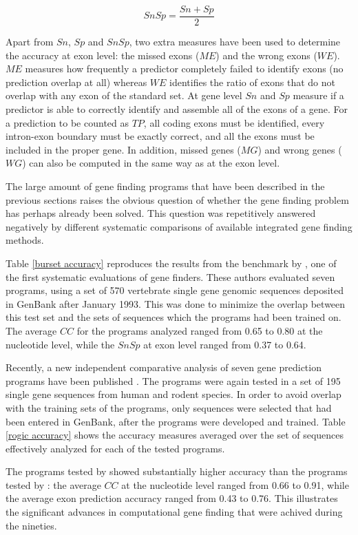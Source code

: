 \begin{equation}
SnSp = \frac{Sn + Sp}{2}
\end{equation}

Apart from $Sn$, $Sp$ and $SnSp$, two extra measures have been used to
determine the accuracy at exon level: the missed exons ($ME$) and the
wrong exons ($WE$). $ME$ measures how frequently a predictor
completely failed to identify exons (no prediction overlap at all)
whereas $WE$ identifies the ratio of exons that do not overlap with
any exon of the standard set. At gene level $Sn$ and $Sp$ measure if a
predictor is able to correctly identify and assemble all of the exons
of a gene. For a prediction to be counted as $TP$, all coding exons
must be identified, every intron-exon boundary must be exactly
correct, and all the exons must be included in the proper gene. In
addition, missed genes ($MG$) and wrong genes ($WG$) can also be
computed in the same way as at the exon level.

The large amount of gene finding programs that have been described in
the previous sections raises the obvious question of whether the gene
finding problem has perhaps already been solved. This question was
repetitively answered negatively by different systematic
comparisons of available integrated gene finding methods.

Table \ref{burset accuracy} reproduces the results from the benchmark
by \cite{burset:1996a}, one of the first systematic evaluations of
gene finders. These authors evaluated seven programs, using a set of
570 vertebrate single gene genomic sequences deposited in GenBank
after January 1993. This was done to minimize the overlap between this
test set and the sets of sequences which the programs had been trained
on. The average $CC$ for the programs analyzed ranged from 0.65 to
0.80 at the nucleotide level, while the $SnSp$ at exon level ranged
from 0.37 to 0.64.

Recently, a new independent comparative analysis of seven gene
prediction programs have been published \citep{rogic:2001a}. The
programs were again tested in a set of 195 single gene sequences from
human and rodent species. In order to avoid overlap with the training
sets of the programs, only sequences were selected that had been
entered in GenBank, after the programs were developed and
trained. Table
\ref{rogic accuracy} shows the accuracy measures averaged over the set
of sequences effectively analyzed for each of the tested programs.

The programs tested by \cite{rogic:2001a} showed substantially higher
accuracy than the programs tested by \cite{burset:1996a}: the average
$CC$ at the nucleotide level ranged from 0.66 to 0.91, while the
average exon prediction accuracy ranged from 0.43 to 0.76. This
illustrates the significant advances in computational gene finding
that were achived during the nineties.

